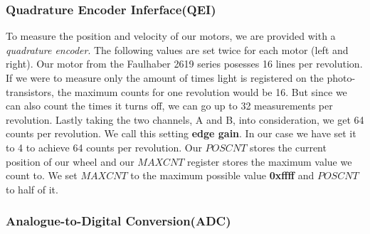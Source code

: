 \subsubsection*{Quadrature Encoder Inferface(QEI)}
To measure the position and velocity of our motors, we are provided with a \textit{quadrature encoder}.
The following values are set twice for each motor (left and right).
\vskip 0.1in
\noindent
Our motor from the Faulhaber 2619 series posesses 16 lines per revolution. If we were to measure only the amount of times light is registered on the photo-transistors, the maximum counts for one revolution would be 16. But since we can also count the times it turns off, we can go up to 32 measurements per revolution. Lastly taking the two channels, A and B, into consideration, we get 64 counts per revolution.
\vskip 0.1in
\noindent
We call this setting \textbf{edge gain}. In our case we have set it to 4 to achieve 64 counts per revolution.
\vskip 0.1in
\noindent
Our $POSCNT$ stores the current position of our wheel and our $MAXCNT$ register stores the maximum value we count to.
\vskip 0.1in
\noindent
We set $MAXCNT$ to the maximum possible value \textbf{0xffff} and $POSCNT$ to half of it.


\subsubsection*{Analogue-to-Digital Conversion(ADC)}


